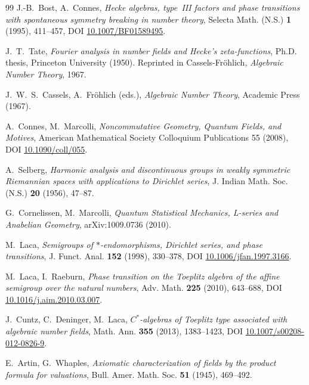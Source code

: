 \documentclass[11pt,a4paper]{article}
\theoremstyle{plain}
\theoremstyle{definition}
\begin{document}
\begin{thebibliography}{99}
J.-B.~Bost, A.~Connes,
\textit{Hecke algebras, type~III factors and phase transitions
with spontaneous symmetry breaking in number theory},
Selecta Math. (N.S.) \textbf{1} (1995), 411--457,
DOI \href{https://doi.org/10.1007/BF01589495}{10.1007/BF01589495}.

J.~T.~Tate,
\textit{Fourier analysis in number fields and Hecke's
zeta-functions},
Ph.D. thesis, Princeton University (1950). Reprinted in
Cassels-Fr\"ohlich, \emph{Algebraic Number Theory}, 1967.

J.~W.~S.~Cassels, A.~Fr\"ohlich (eds.),
\textit{Algebraic Number Theory},
Academic Press (1967).

A.~Connes, M.~Marcolli,
\textit{Noncommutative Geometry, Quantum Fields, and Motives},
American Mathematical Society Colloquium Publications 55 (2008),
DOI \href{https://doi.org/10.1090/coll/055}{10.1090/coll/055}.

A.~Selberg,
\textit{Harmonic analysis and discontinuous groups in weakly
symmetric Riemannian spaces with applications to Dirichlet series},
J. Indian Math. Soc. (N.S.) \textbf{20} (1956), 47--87.

G.~Cornelissen, M.~Marcolli,
\textit{Quantum Statistical Mechanics, L-series and Anabelian Geometry},
arXiv:1009.0736 (2010).

M.~Laca,
\textit{Semigroups of $\ast$-endomorphisms, Dirichlet series, and
phase transitions},
J. Funct. Anal. \textbf{152} (1998), 330--378,
DOI \href{https://doi.org/10.1006/jfan.1997.3166}{10.1006/jfan.1997.3166}.

M.~Laca, I.~Raeburn,
\textit{Phase transition on the Toeplitz algebra of the affine
semigroup over the natural numbers},
Adv. Math. \textbf{225} (2010), 643--688,
DOI \href{https://doi.org/10.1016/j.aim.2010.03.007}{10.1016/j.aim.2010.03.007}.

J.~Cuntz, C.~Deninger, M.~Laca,
\textit{$C^\ast$-algebras of Toeplitz type associated with
algebraic number fields},
Math. Ann. \textbf{355} (2013), 1383--1423,
DOI \href{https://doi.org/10.1007/s00208-012-0826-9}{10.1007/s00208-012-0826-9}.

E.~Artin, G.~Whaples,
\textit{Axiomatic characterization of fields by the product formula
for valuations},
Bull. Amer. Math. Soc. \textbf{51} (1945), 469--492.


\end{thebibliography}
\end{document}
